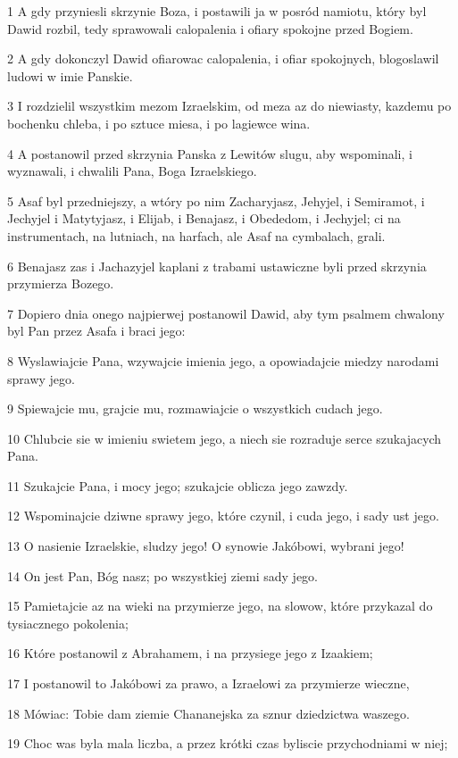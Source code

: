 \par 1 A gdy przyniesli skrzynie Boza, i postawili ja w posród namiotu, który byl Dawid rozbil, tedy sprawowali calopalenia i ofiary spokojne przed Bogiem.
\par 2 A gdy dokonczyl Dawid ofiarowac calopalenia, i ofiar spokojnych, blogoslawil ludowi w imie Panskie.
\par 3 I rozdzielil wszystkim mezom Izraelskim, od meza az do niewiasty, kazdemu po bochenku chleba, i po sztuce miesa, i po lagiewce wina.
\par 4 A postanowil przed skrzynia Panska z Lewitów slugu, aby wspominali, i wyznawali, i chwalili Pana, Boga Izraelskiego.
\par 5 Asaf byl przedniejszy, a wtóry po nim Zacharyjasz, Jehyjel, i Semiramot, i Jechyjel i Matytyjasz, i Elijab, i Benajasz, i Obededom, i Jechyjel; ci na instrumentach, na lutniach, na harfach, ale Asaf na cymbalach, grali.
\par 6 Benajasz zas i Jachazyjel kaplani z trabami ustawiczne byli przed skrzynia przymierza Bozego.
\par 7 Dopiero dnia onego najpierwej postanowil Dawid, aby tym psalmem chwalony byl Pan przez Asafa i braci jego:
\par 8 Wyslawiajcie Pana, wzywajcie imienia jego, a opowiadajcie miedzy narodami sprawy jego.
\par 9 Spiewajcie mu, grajcie mu, rozmawiajcie o wszystkich cudach jego.
\par 10 Chlubcie sie w imieniu swietem jego, a niech sie rozraduje serce szukajacych Pana.
\par 11 Szukajcie Pana, i mocy jego; szukajcie oblicza jego zawzdy.
\par 12 Wspominajcie dziwne sprawy jego, które czynil, i cuda jego, i sady ust jego.
\par 13 O nasienie Izraelskie, sludzy jego! O synowie Jakóbowi, wybrani jego!
\par 14 On jest Pan, Bóg nasz; po wszystkiej ziemi sady jego.
\par 15 Pamietajcie az na wieki na przymierze jego, na slowow, które przykazal do tysiacznego pokolenia;
\par 16 Które postanowil z Abrahamem, i na przysiege jego z Izaakiem;
\par 17 I postanowil to Jakóbowi za prawo, a Izraelowi za przymierze wieczne,
\par 18 Mówiac: Tobie dam ziemie Chananejska za sznur dziedzictwa waszego.
\par 19 Choc was byla mala liczba, a przez krótki czas byliscie przychodniami w niej;
